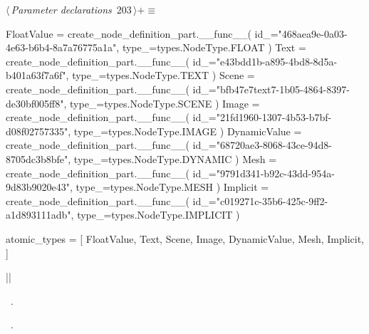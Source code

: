 \documentclass[%
    a4paper,    %
    justified,  %
    nobib,      %
    openany     %
]{tufte-book}
\makeatletter
\renewcommand{\label}[1]{\@tufte@label{##1}}%
\makeatother
\begin{document}
\begin{fullwidth}
\begin{flushleft}
\begin{minipage}{\linewidth}
\begin{list}{}{\setlength{\itemsep}{-\parsep}\setlength{\itemindent}{-\leftmargin}}
\item{}
\end{list}
\end{minipage}\vspace{4ex}
\end{flushleft}
\begin{flushleft} \small
\begin{minipage}{\linewidth}\label{scrap196}\raggedright\small
{} $\langle\,${\itshape Parameter declarations}\nobreak\ {\footnotesize {203}}$\,\rangle+\equiv$
\vspace{-1ex}
\begin{pythoncode}
    FloatValue = create_node_definition_part.__func__(
        id_="468aea9e-0a03-4e63-b6b4-8a7a76775a1a",
        type_=types.NodeType.FLOAT
    )
    Text = create_node_definition_part.__func__(
        id_="e43bdd1b-a895-4bd8-8d5a-b401a63f7a6f",
        type_=types.NodeType.TEXT
    )
    Scene = create_node_definition_part.__func__(
        id_="bfb47e7text7-1b05-4864-8397-de30bf005ff8",
        type_=types.NodeType.SCENE
    )
    Image = create_node_definition_part.__func__(
        id_="21fd1960-1307-4b53-b7bf-d08f02757335",
        type_=types.NodeType.IMAGE
    )
    DynamicValue = create_node_definition_part.__func__(
        id_="68720ae3-8068-43ce-94d8-8705dc3b8bfe",
        type_=types.NodeType.DYNAMIC
    )
    Mesh = create_node_definition_part.__func__(
        id_="9791d341-b92c-43dd-954a-9d83b9020e43",
        type_=types.NodeType.MESH
    )
    Implicit = create_node_definition_part.__func__(
        id_="c019271c-35b6-425c-9ff2-a1d893111adb",
        type_=types.NodeType.IMPLICIT
    )

    atomic_types = [
        FloatValue,
        Text,
        Scene,
        Image,
        DynamicValue,
        Mesh,
        Implicit,
    ]

|\NWsep|
\end{pythoncode}
\vspace{1.5ex}
\footnotesize
\begin{list}{}{\setlength{\itemsep}{-\parsep}\setlength{\itemindent}{-\leftmargin}}
\item \NWtxtMacroDefBy\ .
\item \NWtxtMacroRefIn\ .


\end{list}
\end{minipage}
\end{flushleft}
\end{fullwidth}
\end{document}
